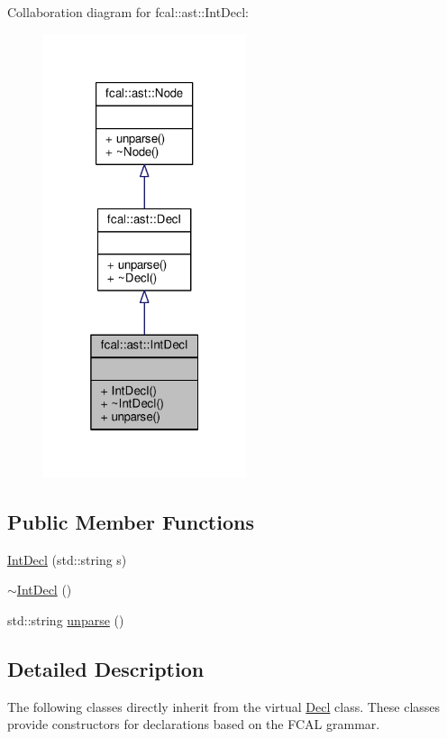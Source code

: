 Collaboration diagram for fcal\+:\+:ast\+:\+:Int\+Decl\+:
\nopagebreak
\begin{figure}[H]
\begin{center}
\leavevmode
\includegraphics[width=169pt]{classfcal_1_1ast_1_1IntDecl__coll__graph}
\end{center}
\end{figure}
\subsection*{Public Member Functions}
\begin{DoxyCompactItemize}
\item 
\hyperlink{classfcal_1_1ast_1_1IntDecl_a2b6be0e39a793d86f71fe429b1a46f12}{Int\+Decl} (std\+::string s)
\item 
\hyperlink{classfcal_1_1ast_1_1IntDecl_a44b8a580dddc86a9bc10052d5a4ac275}{$\sim$\+Int\+Decl} ()
\item 
std\+::string \hyperlink{classfcal_1_1ast_1_1IntDecl_a70cae495e6036b864fb6750cb9acac19}{unparse} ()
\end{DoxyCompactItemize}


\subsection{Detailed Description}
The following classes directly inherit from the virtual \hyperlink{classfcal_1_1ast_1_1Decl}{Decl} class. These classes provide constructors for declarations based on the F\+C\+AL grammar. 

